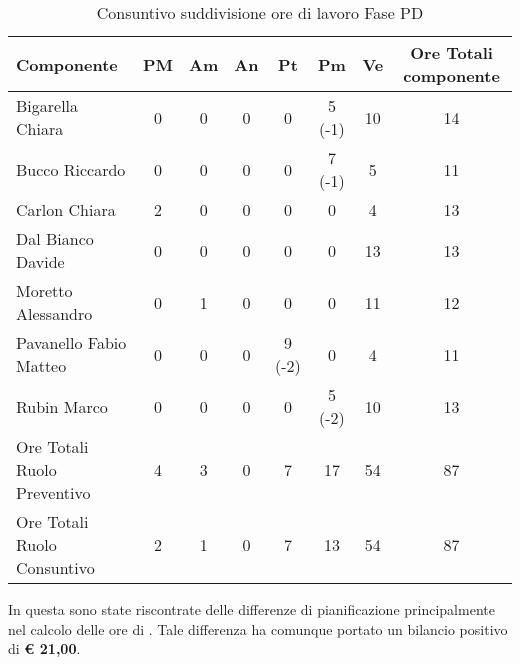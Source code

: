 			\begin{table}[H]
				\begin{center}
					\begin{tabular}{| l | c | c | c | c | c | c | c |}
						\hline
						Componente 					& PM	& Am 	& An 	& Pt 		& Pm 	& Ve 		& Ore Totali componente \\ \hline
						
						Bigarella Chiara 			& 0		& 0		& 0		& 0		& 5 (-1)		& 10 	& 14 \\
						Bucco Riccardo 				& 0		& 0		& 0		& 0		& 7 (-1)			& 5 		& 11 \\
						Carlon Chiara				& 2 	& 0		& 0		& 0		& 0			& 4 		& 13\\
						Dal Bianco Davide 			& 0		& 0		& 0		& 0		& 0			& 13 		& 13  \\
						Moretto Alessandro 			& 0		& 1 	& 0		& 0		& 0			& 11		& 12 \\
						Pavanello Fabio Matteo		& 0		& 0		& 0		& 9 (-2) 	& 0			& 4		& 11  \\
						Rubin Marco					& 0		& 0		& 0		& 0		& 5 (-2) 		& 10		& 13 \\ \hline \hline
						
						Ore Totali Ruolo Preventivo 			& 4 	& 3 	& 0		& 7 	& 17 		& 54 		& 87\\
						Ore Totali Ruolo Consuntivo 			& 2 	& 1 	& 0		& 7 	& 13 		& 54 		& 87\\ \hline
					\end{tabular}
				\end{center}
				\caption{Consuntivo suddivisione ore di lavoro Fase PD}
			\end{table}

		In questa  sono state riscontrate delle differenze di pianificazione principalmente nel calcolo delle ore di . Tale differenza ha comunque portato un bilancio positivo di \textbf{\euro{} 21,00}.
	
	